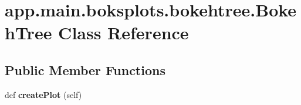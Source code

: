 \hypertarget{classapp_1_1main_1_1boksplots_1_1bokehtree_1_1BokehTree}{}\section{app.\+main.\+boksplots.\+bokehtree.\+Bokeh\+Tree Class Reference}
\label{classapp_1_1main_1_1boksplots_1_1bokehtree_1_1BokehTree}
\subsection*{Public Member Functions}
\begin{DoxyCompactItemize}
\item 
\mbox{\label{classapp_1_1main_1_1boksplots_1_1bokehtree_1_1BokehTree_ab59e84c780a66aea3944cd52b06a527a}} 
def {\bfseries create\+Plot} (self)
\end{DoxyCompactItemize}
